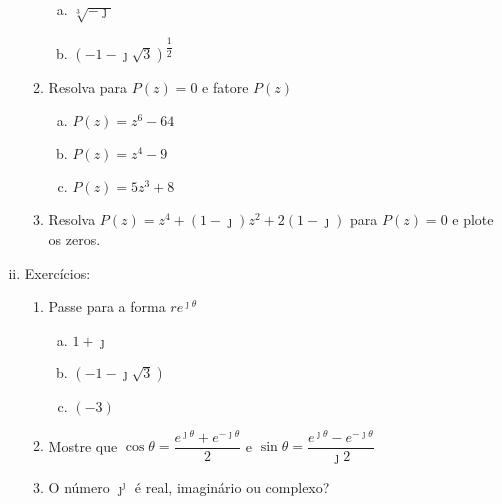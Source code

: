 \begin{enumerate}[i.]
\begin{enumerate}[1.]
\begin{enumerate}[a)]
          \item $\sqrt[3]{- \jmath}$
          \item $\left(-1 - \jmath \sqrt{3}\right)^{\dfrac{1}{2}}$
        \end{enumerate}
      \item Resolva para $P(z) = 0$ e fatore $P(z)$
        \begin{enumerate}[a)]
          \item $P(z) = z^{6} - 64$
          \item $P(z) = z^{4} - 9$
          \item $P(z) = 5z^{3} + 8$
        \end{enumerate}
      \item Resolva $P(z) = z^{4} + \left(1 - \jmath\right) z^{2} + 2\left(1 - \jmath \right)$ para $P(z) = 0$ e plote os zeros.
    \end{enumerate}
  \item Exercícios:
    \begin{enumerate}[1.]
    \item Passe para a forma $re^{\jmath \theta}$
      \begin{enumerate}[a)]
      \item $1 + \jmath$
      \item $\left(- 1 - \jmath \sqrt{3}\right)$
      \item $(-3)$
      \end{enumerate}
    \item Mostre que $\cos{\theta} = \dfrac{e^{\jmath \theta} + e^{-\jmath \theta}}{2}$ e $\sin{\theta} = \dfrac{e^{\jmath \theta} - e^{-\jmath \theta}}{\jmath 2}$
    \item O número $\jmath^{\jmath}$ é real, imaginário ou complexo?
    \end{enumerate}
  \end{enumerate}



\newpage

